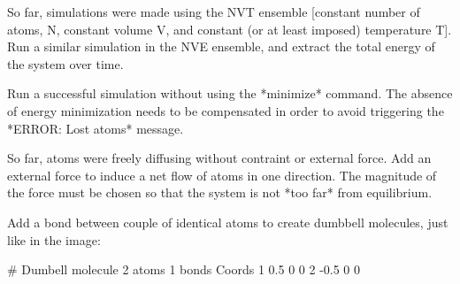 So far, simulations were made using the NVT ensemble [constant number 
of atoms, N, constant volume V, and constant (or at least imposed)
temperature T].
Run a similar simulation in the NVE ensemble, and extract the
total energy of the system over time.




Run a successful simulation without using the *minimize* command.
The absence of energy minimization needs to be compensated
in order to avoid triggering the *ERROR: Lost atoms* message.


So far, atoms were freely diffusing without contraint or external force.
Add an external force to induce a net flow of atoms in one
direction. The magnitude of the force must be chosen so
that the system is not *too far* from equilibrium.


Add a bond between couple of identical atoms to create
dumbbell molecules, just like in the image:




\begin{lcverbatim}
# Dumbell molecule
2 atoms
1 bonds
Coords
1 0.5 0 0
2 -0.5 0 0
\end{lcverbatim}

